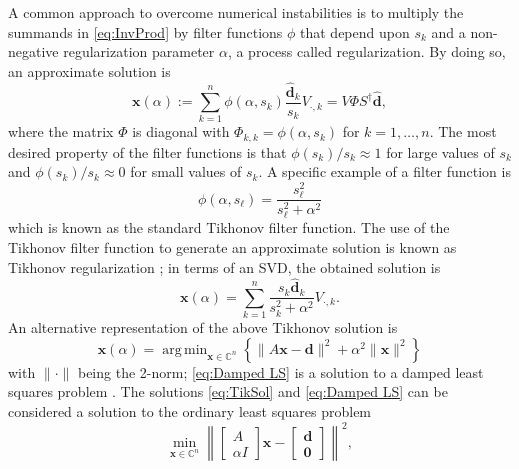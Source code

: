\documentclass[12pt]{article}
\newcommand{\dVec}{\mathbf{d}}	%
\newcommand{\xVec}{\mathbf{x}}	%
\newcommand{\regparam}{\alpha}
\DeclareMathOperator*{\argmin}{arg\,min}
\newcommand{\filt}{\phi}
\newcommand{\zeroVec}{\bm{0}}	%
\newcommand{\singular}{s}	%
\newcommand{\svd}[1]{\widehat{#1}}	%
\begin{document}
A common approach to overcome numerical instabilities is to multiply the summands in \eqref{eq:InvProd} by filter functions $\filt$ that depend upon $\singular_k$ and a non-negative regularization parameter $\regparam$, a process called regularization. By doing so, an approximate solution is
\begin{equation}
\label{eq:ApproxSol}
\xVec(\regparam) := \sum_{k=1}^{n} \filt(\regparam,\singular_k) \frac{\svd{\dVec}_k}{\singular_k}V_{\cdot,k}  = V\Phi{S}^\dagger\svd{\dVec},
\end{equation}
where the matrix $\Phi$ is diagonal with $\Phi_{k,k} = \filt(\regparam,\singular_k)$ for $k = 1,\ldots,{n}$. The most desired property of the filter functions is that $\filt(\singular_k)/\singular_k \approx 1$  for large values of $\singular_k$ and $\filt(\singular_k)/\singular_k \approx 0$ for small values of $\singular_k$. A specific example of a filter function is
\begin{equation}
\label{eq:TikFilt}
\filt(\regparam,\singular_\ell)  = \frac{\singular_\ell^2}{\singular_\ell^2 + \regparam^2}
\end{equation}
which is known as the standard Tikhonov filter function. The use of the Tikhonov filter function to generate an approximate solution is known as Tikhonov regularization \cite{Tikh1963}; in terms of an SVD, the obtained solution is
\begin{equation}
\label{eq:TikSol}
\xVec(\regparam) = \sum_{k = 1}^{n} \frac{\singular_k \svd{\dVec}_k}{\singular_k^2 + \regparam^2}V_{\cdot,k}.
\end{equation}
An alternative representation of the above Tikhonov solution is
\begin{equation}
\label{eq:Damped LS}
\xVec(\regparam) = \argmin_{\xVec \in \mathbb{C}^n} \left\{\|A\xVec - \dVec\|^2 + \regparam^2\|\xVec\|^2\right\}
\end{equation}
with $\|\cdot\|$ being the 2-norm; \eqref{eq:Damped LS} is a solution to a damped least squares problem \cite{ABT}. The solutions \eqref{eq:TikSol} and \eqref{eq:Damped LS} can be considered a solution to the ordinary least squares problem
\begin{equation}
\label{eq:Ordinary LS}
\min_{\xVec \in \mathbb{C}^n} \left\|
\begin{bmatrix}
A \\
\regparam I
\end{bmatrix}\xVec - 
\begin{bmatrix}
\dVec \\
\zeroVec
\end{bmatrix}
\right\|^2,
\end{equation}
\end{document}
